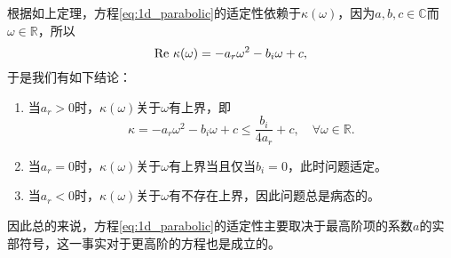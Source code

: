\documentclass[a4paper,10pt]{ctexart}
\begin{document}
根据如上定理，方程\eqref{eq:1d_parabolic}的适定性依赖于$ \kappa(\omega) $，因为$ a,b,c\in \mathbb{C} $而$ \omega\in \mathbb{R} $，所以
\[
    {\rm Re}\ \kappa(\omega) = -a_r\omega^2 - b_i \omega + c,
\]
于是我们有如下结论：
\begin{enumerate}
    \item 当$ a_r>0 $时，$ \kappa(\omega) $关于$ \omega $有上界，即
    \[
        \kappa = -a_r\omega^2 - b_i \omega + c \leqslant \frac{b_i}{4a_r} +c,\quad \forall \omega\in \mathbb{R}.
    \]
    \item 当$ a_r=0 $时，$ \kappa(\omega) $关于$ \omega $有上界当且仅当$ b_i =  0 $，此时问题适定。
    \item 当$ a_r<0 $时，$ \kappa(\omega) $关于$ \omega $有不存在上界，因此问题总是病态的。
\end{enumerate}
因此总的来说，方程\eqref{eq:1d_parabolic}的适定性主要取决于最高阶项的系数$ a $的实部符号，这一事实对于更高阶的方程也是成立的。
\end{document}
